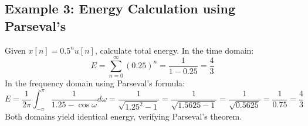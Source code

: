\documentclass[11pt,a4paper]{article}
\begin{document}
\subsection{Example 3: Energy Calculation using Parseval's}
Given $x[n] = 0.5^n u[n]$, calculate total energy.
In the time domain:
\begin{equation*}
E = \sum_{n=0}^{\infty} (0.25)^n = \frac{1}{1 - 0.25} = \frac{4}{3}
\end{equation*}
In the frequency domain using Parseval's formula:
\begin{equation*}
E = \frac{1}{2\pi} \int_{-\pi}^{\pi} \frac{1}{1.25 - \cos\omega} d\omega = \frac{1}{\sqrt{1.25^2 - 1}} = \frac{1}{\sqrt{1.5625 - 1}} = \frac{1}{\sqrt{0.5625}} = \frac{1}{0.75} = \frac{4}{3}
\end{equation*}
Both domains yield identical energy, verifying Parseval's theorem.
\end{document}

